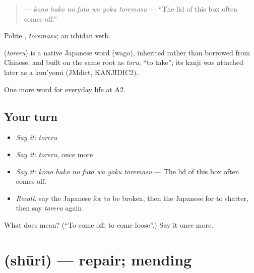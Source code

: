 \begin{quote}
\textbf{    } — \emph{kono hako no futa wa yoku toremasu} — \textquotedblleft{}The lid of this box often comes off.\textquotedblright{}
\end{quote}

Polite \textbf{}, \emph{toremasu}; an ichidan verb.

\begin{cousinweb}
\textbf{} (\emph{toreru}) is a native Japanese word (wago), inherited rather than borrowed from Chinese, and built on the same root as \emph{toru}, \textquotedblleft{}to take\textquotedblright{}; its kanji was attached later as a kun'yomi (JMdict, KANJIDIC2).
\end{cousinweb}

\begin{grammarlens}[title={What you've built}]
One more word for everyday life at A2.
\end{grammarlens}

\subsection*{Your turn}
\begin{itemize}
\raggedright
  \item \emph{Say it:} \emph{toreru}
  \item \emph{Say it:} \emph{toreru}, once more
  \item \emph{Say it:} \emph{kono hako no futa wa yoku toremasu} — The lid of this box often comes off.
  \item \emph{Recall:} say the Japanese for to be broken, then the Japanese for to shatter, then say \emph{toreru} again
\end{itemize}

\begin{tcolorbox}[breakable,colback=teal!4,colframe=teal!35!black,title={Before you move on}]
What does  mean? (\textquotedblleft{}To come off; to come loose\textquotedblright{}.) Say it once more.
\end{tcolorbox}
\section[\texorpdfstring{\ja{しゅうり} (shūri)}{しゅうり (shūri)}]{ (shūri) — repair; mending}

\label{lesson:JA-C162-shuuri}



